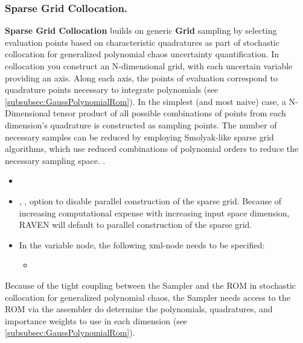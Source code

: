 \subsubsection{Sparse Grid Collocation.}
\label{subsubsubsec:SparseGridCollocation}
\textbf{Sparse Grid Collocation} builds on generic \textbf{Grid} sampling by selecting evaluation points based on characteristic quadratures as part of stochastic collocation for generalized polynomial chaos uncertainty quantification.  In collocation you construct an N-dimensional grid, with each uncertain variable providing an axis.  Along each axis, the points of evaluation correspond to quadrature points necessary to integrate polynomials (see \ref{subsubsec:GaussPolynomialRom}).  In the simplest (and most  naive) case, a N-Dimensional tensor product of all possible combinations of points from each dimension's quadrature is constructed as sampling points.  The number of necessary samples can be reduced by employing Smolyak-like sparse grid algorithms, which use reduced combinations of polynomial orders to reduce the necessary sampling space.  .
\begin{itemize}
\itemsep0em
\item \nameDescription
\item {}, , option to disable parallel construction of the sparse grid.  Because of increasing computational expense with increasing input space dimension, RAVEN will default to parallel construction of the sparse grid.  
\end{itemize}
\begin{itemize}
\item \variableDescription
 In the variable node, the following xml-node needs to be specified:
 \begin{itemize}
    \item \distributionDescription
 \end{itemize} \end{itemize}
Because of the tight coupling between the Sampler and the ROM in stochastic collocation for generalized polynomial chaos, the Sampler needs access to the ROM via the assembler do determine the polynomials, quadratures, and importance weights to use in each dimension (see \ref{subsubsec:GaussPolynomialRom}).  %
